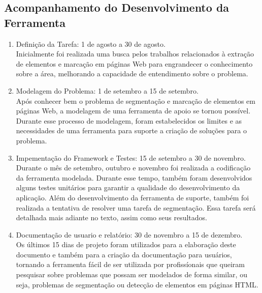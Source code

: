 \documentclass[12pt, a4paper]{article}
\begin{document}
  \subsection{Acompanhamento do Desenvolvimento da Ferramenta}
\begin{enumerate}
\item Definição da Tarefa: 1 de agosto a 30 de agosto. \\
Inicialmente foi realizada uma busca pelos trabalhos relacionados à
extração de elementos e marcação em páginas Web para engrandecer o
conhecimento sobre a área, melhorando a capacidade de entendimento
sobre o problema.

\item Modelagem do Problema: 1 de setembro a 15 de setembro. \\ 
Após conhecer bem o problema de segmentação e marcação de elementos em
páginas Web, a modelagem de uma ferramenta de apoio se tornou possível.
Durante esse processo de modelagem, foram estabelecidos os limites e as
necessidades de uma ferramenta para suporte a criação de soluções para
o problema.

\item Impementação do Framework e Testes: 15 de setembro a 30 de
novembro. \\
Durante o mês de setembro, outubro e novembro foi realizada a
codificação da ferramenta modelada. Durante esse tempo, também foram
desenvolvidos alguns testes unitários para garantir a qualidade do
desenvolvimento da aplicação. Além do desenvolvimento da ferramenta de
suporte, também foi realizada a tentativa de resolver uma tarefa de
segmentação. Essa tarefa será detalhada mais adiante no texto, assim como
seus resultados.

\item Documentação de usuario e relatório: 30 de novembro a 15 de
dezembro. \\
Os últimos 15 dias de projeto foram utilizados para a elaboração deste
documento e também para a criação da documentação para usuários,
tornando a ferramenta fácil de ser utilizada por profissíonais que
queiram pesquisar sobre problemas que possam ser modelados de forma
similar, ou seja, problemas de segmentação ou detecção de elementos em
páginas HTML.
\end{enumerate}
\end{document}
